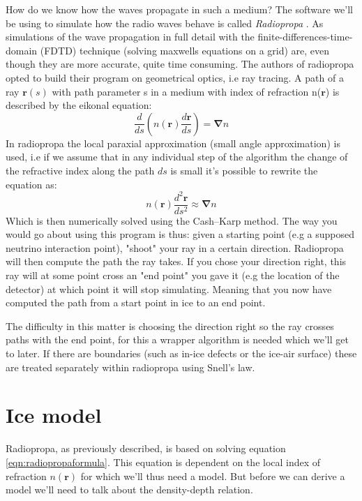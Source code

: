 How do we know how the waves propagate in such a medium?  The software we'll be
using to simulate how the radio waves behave is called \textit{Radiopropa}
\cite{Winchen_2019}. As simulations of the wave propagation in full detail with
the finite-differences-time-domain (FDTD) technique \cite{1138693} (solving
maxwells equations on a grid) are, even though they are more accurate, quite time
consuming. The authors of radiopropa opted to build their program on
geometrical optics, i.e ray tracing. A path of a ray $\mathbf{r}(s)$ with path
parameter s in a medium with index of refraction n($\mathbf{r}$) is described
by the eikonal equation\cite{herman2019treatise}:
\begin{equation}
	\frac{d}{ds}\left(n(\mathbf{r})\frac{d\mathbf{r}}{ds}\right) = \mathbf{\nabla} n
\end{equation}
In radiopropa the local paraxial approximation (small angle approximation) is
used, i.e if we assume that in any individual step of the algorithm the change
of the refractive index along the path $ds$ is small it's possible to rewrite
the equation as:
\begin{equation}
	n(\mathbf{r})\frac{d^2\mathbf{r}}{ds^2} \approx \mathbf{\nabla} n
	\label{eqn:radiopropaformula}
\end{equation}
Which is then numerically solved using the Cash–Karp method.  The way you would
go about using this program is thus: given a starting point (e.g a supposed
neutrino interaction point), "shoot" your ray in a
certain direction. Radiopropa will then compute the path the ray takes. 
If you chose your direction right, this ray will at some point cross an
"end point" you gave it (e.g the location of the detector) at which point it will
stop simulating. Meaning that you now have computed the path from a start point in ice
to an end point.

The difficulty in this matter is choosing the direction right so the ray
crosses paths with the end point, for this a wrapper algorithm is needed which we'll
get to later.  If there are boundaries (such as in-ice defects or the ice-air surface) these
are treated separately within radiopropa using Snell's law. 
\section{Ice model}
\label{section:Ice Model}
Radiopropa, as previously described, is based on solving equation \ref{eqn:radiopropaformula}.
This equation is dependent on the local index of refraction $n(\mathbf{r})$ for which
we'll thus need a model. But before we can derive a model we'll need to talk about the
density-depth relation.


